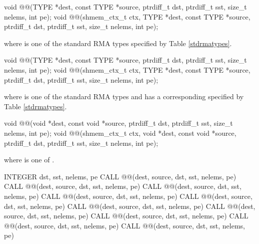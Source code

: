 
\begin{apidefinition}

\begin{C11synopsis}
void @@(TYPE *dest, const TYPE *source, ptrdiff_t dst, ptrdiff_t sst, size_t nelems, int pe);
void @@(shmem_ctx_t ctx, TYPE *dest, const TYPE *source, ptrdiff_t dst, ptrdiff_t sst, size_t nelems, int pe);
\end{C11synopsis}
where \TYPE{} is one of the standard \ac{RMA} types specified by Table \ref{stdrmatypes}.

\begin{Csynopsis}
void @@(TYPE *dest, const TYPE *source, ptrdiff_t dst, ptrdiff_t sst, size_t nelems, int pe);
void @@(shmem_ctx_t ctx, TYPE *dest, const TYPE *source, ptrdiff_t dst, ptrdiff_t sst, size_t nelems, int pe);
\end{Csynopsis}
where \TYPE{} is one of the standard \ac{RMA} types and has a corresponding \TYPENAME{} specified by Table \ref{stdrmatypes}.

\begin{CsynopsisCol}
void @@(void *dest, const void *source, ptrdiff_t dst, ptrdiff_t sst, size_t  nelems, int pe);
void @@(shmem_ctx_t ctx, void *dest, const void *source, ptrdiff_t dst, ptrdiff_t sst, size_t nelems, int pe);
\end{CsynopsisCol}
where \SIZE{} is one of .

\begin{Fsynopsis}
INTEGER dst, sst, nelems, pe
CALL @@(dest, source, dst, sst, nelems, pe)
CALL @@(dest, source, dst, sst, nelems, pe)
CALL @@(dest, source, dst, sst, nelems, pe)
CALL @@(dest, source, dst, sst, nelems, pe)
CALL @@(dest, source, dst, sst, nelems, pe)
CALL @@(dest, source, dst, sst, nelems, pe)
CALL @@(dest, source, dst, sst, nelems, pe)
CALL @@(dest, source, dst, sst, nelems, pe)
CALL @@(dest, source, dst, sst, nelems, pe)
CALL @@(dest, source, dst, sst, nelems, pe)
\end{Fsynopsis}


\end{apidefinition}
